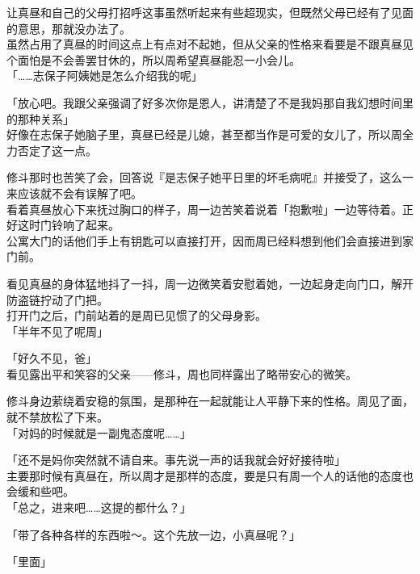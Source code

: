让真昼和自己的父母打招呼这事虽然听起来有些超现实，但既然父母已经有了见面的意思，那就没办法了。\\

虽然占用了真昼的时间这点上有点对不起她，但从父亲的性格来看要是不跟真昼见个面怕是不会善罢甘休的，所以周希望真昼能忍一小会儿。\\

「……志保子阿姨她是怎么介绍我的呢」

「放心吧。我跟父亲强调了好多次你是恩人，讲清楚了不是我妈那自我幻想时间里的那种关系」\\

好像在志保子她脑子里，真昼已经是儿媳，甚至都当作是可爱的女儿了，所以周全力否定了这一点。

修斗那时也苦笑了会，回答说『是志保子她平日里的坏毛病呢』并接受了，这么一来应该就不会有误解了吧。\\

看着真昼放心下来抚过胸口的样子，周一边苦笑着说着「抱歉啦」一边等待着。正好这时门铃响了起来。\\

公寓大门的话他们手上有钥匙可以直接打开，因而周已经料想到他们会直接进到家门前。

看见真昼的身体猛地抖了一抖，周一边微笑着安慰着她，一边起身走向门口，解开防盗链拧动了门把。\\

打开门之后，门前站着的是周已见惯了的父母身影。\\

「半年不见了呢周」

「好久不见，爸」\\

看见露出平和笑容的父亲——修斗，周也同样露出了略带安心的微笑。

修斗身边萦绕着安稳的氛围，是那种在一起就能让人平静下来的性格。周见了面，就不禁放松了下来。\\

「对妈的时候就是一副鬼态度呢……」

「还不是妈你突然就不请自来。事先说一声的话我就会好好接待啦」\\

主要那时候有真昼在，所以周才是那样的态度，要是只有周一个人的话他的态度也会缓和些吧。\\

「总之，进来吧……这提的都什么？」

「带了各种各样的东西啦～。这个先放一边，小真昼呢？」

「里面」\\

